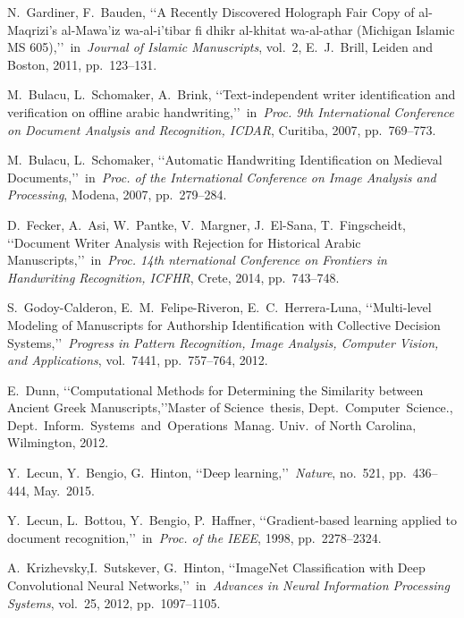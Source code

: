 \documentclass[conference,a4paper,twocolumn]{IEEEtran}
\begin{document}
\begin{thebibliography}{99}

 N.~Gardiner, F.~Bauden, \lq\lq A Recently Discovered Holograph Fair Copy of al-Maqrizi's al-Mawa'iz wa-al-i'tibar fi dhikr al-khitat wa-al-athar (Michigan Islamic MS 605),\rq\rq~in~\emph{Journal of Islamic Manuscripts}, vol.~2, E.~J.~Brill, Leiden and Boston, 2011, pp.~123--131.

 M.~Bulacu, L.~Schomaker, A.~Brink, \lq\lq Text-independent writer identification and verification on offline arabic handwriting,\rq\rq~in~\emph{Proc. 9th International Conference on Document Analysis and Recognition, ICDAR}, Curitiba, 2007, pp.~769--773.

 M.~Bulacu, L.~Schomaker, \lq\lq Automatic Handwriting Identification on Medieval Documents,\rq\rq~in~\emph{Proc. of the International Conference on Image Analysis and Processing}, Modena, 2007, pp.~279--284.

 D.~Fecker, A.~Asi, W.~Pantke, V.~Margner, J.~El-Sana, T.~Fingscheidt, \lq\lq Document Writer Analysis with Rejection for Historical Arabic Manuscripts,\rq\rq~in~\emph{Proc. 14th nternational Conference on Frontiers in Handwriting Recognition, ICFHR}, Crete, 2014, pp.~743--748.

 S.~Godoy-Calderon, E.~M.~Felipe-Riveron, E.~C.~Herrera-Luna, \lq\lq Multi-level Modeling of Manuscripts for Authorship Identification with Collective Decision Systems,\rq\rq~\emph{Progress in Pattern Recognition, Image Analysis, Computer Vision, and Applications}, vol.~7441, pp.~757--764, 2012.

 E.~Dunn, \lq\lq Computational Methods for Determining the Similarity between Ancient Greek Manuscripts,\rq\rq Master of Science~thesis, Dept.~Computer~Science., Dept.~Inform.~Systems~and~Operations~Manag. Univ.~of North Carolina, Wilmington, 2012.

 Y.~Lecun, Y.~Bengio, G.~Hinton, \lq\lq Deep learning,\rq\rq~\emph{Nature}, no.~521, pp.~436--444, May.~2015.

 Y.~Lecun, L.~Bottou, Y.~Bengio, P.~Haffner, \lq\lq Gradient-based learning applied to document recognition,\rq\rq~in~\emph{Proc. of the IEEE}, 1998, pp.~2278--2324.

 A.~Krizhevsky,I.~Sutskever, G.~Hinton, \lq\lq ImageNet Classification with Deep Convolutional Neural Networks,\rq\rq~in~\emph{Advances in Neural Information Processing Systems}, vol.~25, 2012, pp.~1097--1105.


\end{thebibliography}
\end{document}
